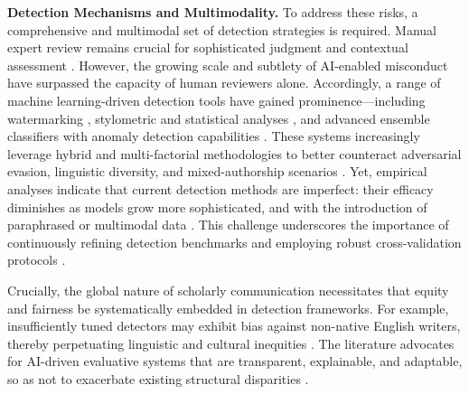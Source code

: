 \documentclass[sigconf]{acmart}
\begin{document}
\textbf{Detection Mechanisms and Multimodality.}
To address these risks, a comprehensive and multimodal set of detection strategies is required. Manual expert review remains crucial for sophisticated judgment and contextual assessment \cite{ref2,ref23,ref82,ref86,ref97}. However, the growing scale and subtlety of AI-enabled misconduct have surpassed the capacity of human reviewers alone. Accordingly, a range of machine learning-driven detection tools have gained prominence—including watermarking \cite{ref10,ref53,ref86,ref91,ref92,ref97}, stylometric and statistical analyses \cite{ref14,ref84,ref85,ref95,ref98}, and advanced ensemble classifiers with anomaly detection capabilities \cite{ref14,ref41,ref83,ref95,ref96,ref98,ref109,ref110}. These systems increasingly leverage hybrid and multi-factorial methodologies to better counteract adversarial evasion, linguistic diversity, and mixed-authorship scenarios \cite{ref84,ref85,ref95,ref97,ref100}. Yet, empirical analyses indicate that current detection methods are imperfect: their efficacy diminishes as models grow more sophisticated, and with the introduction of paraphrased or multimodal data \cite{ref14,ref80,ref85,ref95,ref96,ref97,ref100}. This challenge underscores the importance of continuously refining detection benchmarks and employing robust cross-validation protocols \cite{ref14,ref41,ref85,ref92,ref98,ref100}.

Crucially, the global nature of scholarly communication necessitates that equity and fairness be systematically embedded in detection frameworks. For example, insufficiently tuned detectors may exhibit bias against non-native English writers, thereby perpetuating linguistic and cultural inequities \cite{ref14,ref41,ref70,ref95,ref97,ref98,ref100}. The literature advocates for AI-driven evaluative systems that are transparent, explainable, and adaptable, so as not to exacerbate existing structural disparities \cite{ref2,ref41,ref76,ref80,ref81,ref102}.
\end{document}
